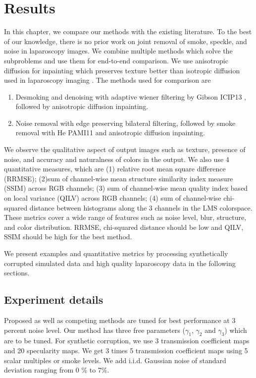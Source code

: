 \chapter{Results}

In this chapter, we compare our methods with the existing literature. To the best of our knowledge, there is no prior work on joint removal of smoke, speckle, and noise in laparoscopy images. We combine multiple methods which solve the subproblems and use them for end-to-end comparison. We use anisotropic diffusion for inpainting which preserves texture better than isotropic diffusion used in laparoscopy imaging \cite{saint2011detection, arnold2010speckle}. The methods used for comparison are
\begin{enumerate}
    \item Desmoking and denoising with adaptive wiener filtering by Gibson ICIP13 \cite{gibson2013wiener}, followed by anisotropic diffusion inpainting.
    \item Noise removal with edge preserving bilateral filtering, followed by smoke removal with He PAMI11 \cite{he2011dark} and anisotropic diffusion inpainting.
\end{enumerate}

We observe the qualitative aspect of output images such as texture, presence of noise, and accuracy and naturalness of colors in the output. We also use 4 quantitative measures, which are (1) relative root mean square difference (RRMSE); (2)sum of channel-wise mean structure similarity index measure (SSIM) across RGB channels; (3) sum of channel-wise mean quality index based on local variance (QILV) across RGB channels; (4) sum of channel-wise chi-squared distance between histograms along the 3 channels in the LMS colorspace. These metrics cover a wide range of features such as noise level, blur, structure, and color distribution. RRMSE, chi-squared distance should be low and QILV, SSIM should be high for the best method.

We present examples and quantitative metrics by processing synthetically corrupted simulated data and high quality laparoscopy data in the following sections.

\section{Experiment details}
Proposed as well as competing methods are tuned for best performance at 3 percent noise level. Our method has three free parameters ($\gamma_1$,  $\gamma_2$ and $\gamma_3$) which are to be tuned. For synthetic corruption, we use 3 transmission coefficient maps and 20 specularity maps. We get 3 times 5 transmission coefficient maps using 5 scalar multiples or smoke levels. We add i.i.d. Gaussian noise of standard deviation ranging from 0 \% to 7\%. 

